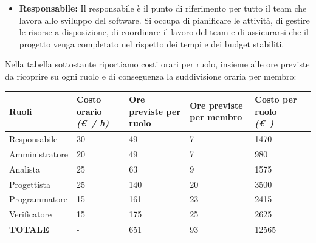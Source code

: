 \documentclass{article}
\begin{document}
\begin{itemize}
\begin{itemize}
        \item \textbf{Responsabile:} Il responsabile è il punto di riferimento per tutto il team che lavora allo sviluppo del software. Si occupa di pianificare le attività, di gestire le risorse a disposizione, di coordinare il lavoro del team e di assicurarsi che il progetto venga completato nel rispetto dei tempi e dei budget stabiliti.
    \end{itemize}
    \pagebreak
    Nella tabella sottostante riportiamo costi orari per ruolo, insieme alle ore previste da ricoprire su ogni ruolo e di conseguenza la suddivisione oraria per membro:
    \vspace{0.5cm}
    \begin{center}
        
    \begin{tabular}{|C{3cm}|C{2cm}|C{2cm}|C{2cm}|C{2cm}|C{2cm}|}
        \hline

        \textbf{Ruoli} & \textbf{Costo orario} \linebreak \textit{(\euro\ / h)} & \textbf{Ore previste per ruolo} & \textbf{Ore previste per membro} & \textbf{Costo per ruolo} \linebreak \textit{(\euro\ )} \\
        \hline\hline
        
        Responsabile & 30 & 49 & 7 & 1470\\
        \hline
        
        Amministratore & 20 & 49 & 7 & 980\\
        \hline
        
        Analista & 25 & 63 & 9 & 1575\\
        \hline 
        
        Progettista & 25 & 140 & 20 & 3500\\ 
        \hline
        
        Programmatore & 15 & 161 & 23 & 2415\\
        \hline
        
        Verificatore & 15 & 175 & 25 & 2625\\
        \hline\hline
        
        \textbf{TOTALE} & - & 651 & 93 & 12565\\
        \hline
    \end{tabular}
    \end{center}

    
    \vspace{0.5cm}


\end{itemize}
\end{document}
